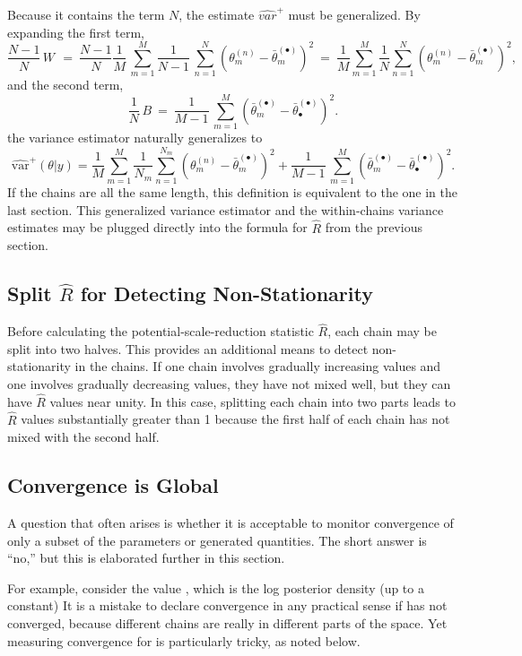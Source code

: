 Because it contains the term $N$, the estimate $\widehat{var}^{+}$
must be generalized.  By expanding the first term,
\[
\frac{N-1}{N}\, W \,
\ = \
\frac{N-1}{N} \frac{1}{M} \, \sum_{m=1}^M
\frac{1}{N-1} \, \sum_{n=1}^N (\theta^{(n)}_m -
\bar{\theta}^{(\bullet)}_m)^2
\ = \
\frac{1}{M}
\sum_{m=1}^M
\frac{1}{N}
\sum_{n=1}^N (\theta^{(n)}_m -
\bar{\theta}^{(\bullet)}_m)^2,
\]
and the second term,
\[
\frac{1}{N}\, B
\ = \
\frac{1}{M-1} \, \sum_{m=1}^M (\bar{\theta}^{(\bullet)}_{m} - \bar{\theta}^{(\bullet)}_{\bullet})^2.
\]
the variance estimator naturally generalizes to
\[
\widehat{\mbox{var}}^{+}\!(\theta|y)
=
\frac{1}{M}
\sum_{m=1}^M
\frac{1}{N_m}
\sum_{n=1}^{N_m} (\theta^{(n)}_m -
\bar{\theta}^{(\bullet)}_m)^2
+
\frac{1}{M-1} \, \sum_{m=1}^M (\bar{\theta}^{(\bullet)}_{m} -
\bar{\theta}^{(\bullet)}_{\bullet})^2.
\]
%
If the chains are all the same length, this definition is equivalent
to the one in the last section.  This generalized variance estimator
and the within-chains variance estimates may be plugged directly into
the formula for $\hat{R}$ from the previous section.


\subsection{Split $\hat{R}$ for Detecting Non-Stationarity}

Before calculating the potential-scale-reduction statistic $\hat{R}$,
each chain may be split into two halves.  This provides an additional
means to detect non-stationarity in the chains.  If one chain involves
gradually increasing values and one involves gradually decreasing
values, they have not mixed well, but they can have $\hat{R}$ values
near unity.  In this case, splitting each chain into two parts leads
to $\hat{R}$ values substantially greater than 1 because the first
half of each chain has not mixed with the second half.


\subsection{Convergence is Global}

A question that often arises is whether it is acceptable to monitor
convergence of only a subset of the parameters or generated
quantities.  The short answer is ``no,'' but this is elaborated
further in this section.

For example, consider the value , which is the log
posterior density (up to a constant) It is a mistake to declare
convergence in any practical sense if \code{lp\_\_} has not converged,
because different chains are really in different parts of the space.
Yet measuring convergence for \code{lp\_\_} is particularly tricky, as
noted below.


